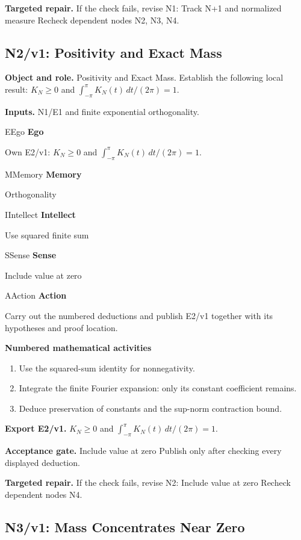 \documentclass[preprint,12pt,aps,pra,showkeys,amsmath,amssymb,superscriptaddress,floatfix]{revtex4-2}
\theoremstyle{definition}
\theoremstyle{remark}
\newcommand{\mmfaculty}[3]{%
 \begin{mmfacultybox}{#1}{#2}
 {\sffamily\bfseries\color{MMBlue}#2}\par\smallskip #3
 \end{mmfacultybox}}
\newcommand{\field}[2]{\par\smallskip\noindent\textbf{#1.} #2\par}
\begin{document}
\field{Targeted repair}{If the check fails, revise N1: Track N+1 and normalized measure Recheck
dependent nodes N2, N3, N4.}

\clearpage

\subsection{N2/v1: Positivity and Exact Mass}

\field{Object and role}{Positivity and Exact Mass. Establish the following local result:
\(K_N\ge0\) and \(\int_{-\pi}^{\pi}K_N(t)\,dt/(2\pi)=1\).}

\field{Inputs}{N1/E1 and finite exponential orthogonality.}

\mmfaculty{E}{Ego}{Own E2/v1: \(K_N\ge0\) and \(\int_{-\pi}^{\pi}K_N(t)\,dt/(2\pi)=1\).}

\mmfaculty{M}{Memory}{Orthogonality}

\mmfaculty{I}{Intellect}{Use squared finite sum}

\mmfaculty{S}{Sense}{Include value at zero}

\mmfaculty{A}{Action}{Carry out the numbered deductions and publish E2/v1 together with its
hypotheses and proof location.}

\smallskip\noindent\textbf{Numbered mathematical activities}

\begin{enumerate}[label=N2.\arabic*,leftmargin=3.4em]

\item Use the squared-sum identity for nonnegativity.

\item Integrate the finite Fourier expansion: only its constant coefficient
remains.

\item Deduce preservation of constants and the sup-norm contraction bound.

\end{enumerate}

\field{Export E2/v1}{\(K_N\ge0\) and \(\int_{-\pi}^{\pi}K_N(t)\,dt/(2\pi)=1\).}

\field{Acceptance gate}{Include value at zero Publish only after checking every displayed
deduction.}

\field{Targeted repair}{If the check fails, revise N2: Include value at zero Recheck dependent
nodes N4.}

\clearpage

\subsection{N3/v1: Mass Concentrates Near Zero}
\end{document}
